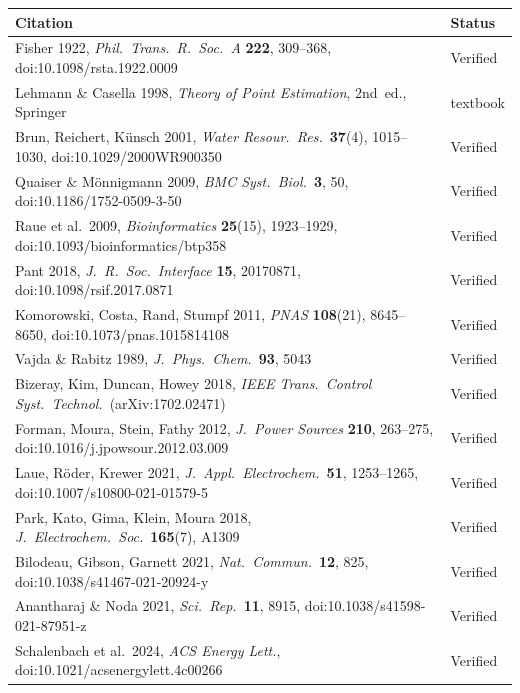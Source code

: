 \documentclass[11pt]{article}
\begin{document}
\begingroup
\small
\setlength{\tabcolsep}{4pt}
\renewcommand{\arraystretch}{1.2}
\begin{longtable}{@{}p{} p{}@{}}
\toprule
\textbf{Citation} & \textbf{Status} \\
\midrule
\endhead
Fisher 1922, \emph{Phil.~Trans.~R.~Soc.~A} \textbf{222}, 309--368,
doi:10.1098/rsta.1922.0009 & Verified \\
Lehmann \& Casella 1998, \emph{Theory of Point Estimation}, 2nd~ed., Springer
& textbook \\
Brun, Reichert, K\"unsch 2001, \emph{Water Resour.~Res.}\ \textbf{37}(4),
1015--1030, doi:10.1029/2000WR900350 & Verified \\
Quaiser \& M\"onnigmann 2009, \emph{BMC Syst.~Biol.}\ \textbf{3}, 50,
doi:10.1186/1752-0509-3-50 & Verified \\
Raue et al.\ 2009, \emph{Bioinformatics} \textbf{25}(15), 1923--1929,
doi:10.1093/bioinformatics/btp358 & Verified \\
Pant 2018, \emph{J.~R.~Soc.~Interface} \textbf{15}, 20170871,
doi:10.1098/rsif.2017.0871 & Verified \\
Komorowski, Costa, Rand, Stumpf 2011, \emph{PNAS} \textbf{108}(21), 8645--8650,
doi:10.1073/pnas.1015814108 & Verified \\
Vajda \& Rabitz 1989, \emph{J.~Phys.~Chem.}\ \textbf{93}, 5043 & Verified \\
Bizeray, Kim, Duncan, Howey 2018, \emph{IEEE Trans.~Control Syst.~Technol.}\
(arXiv:1702.02471) & Verified \\
Forman, Moura, Stein, Fathy 2012, \emph{J.~Power Sources} \textbf{210},
263--275, doi:10.1016/j.jpowsour.2012.03.009 & Verified \\
Laue, R\"oder, Krewer 2021, \emph{J.~Appl.~Electrochem.}\ \textbf{51},
1253--1265, doi:10.1007/s10800-021-01579-5 & Verified \\
Park, Kato, Gima, Klein, Moura 2018, \emph{J.~Electrochem.~Soc.}\
\textbf{165}(7), A1309 & Verified \\
Bilodeau, Gibson, Garnett 2021, \emph{Nat.~Commun.}\ \textbf{12}, 825,
doi:10.1038/s41467-021-20924-y & Verified \\
Anantharaj \& Noda 2021, \emph{Sci.~Rep.}\ \textbf{11}, 8915,
doi:10.1038/s41598-021-87951-z & Verified \\
Schalenbach et al.\ 2024, \emph{ACS Energy Lett.},
doi:10.1021/acsenergylett.4c00266 & Verified \\
\bottomrule
\end{longtable}
\endgroup
\end{document}
